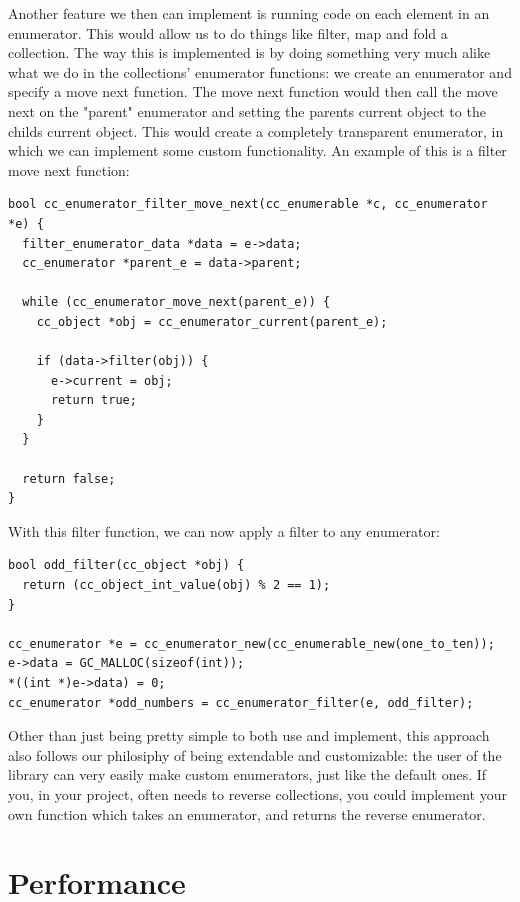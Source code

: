 \documentclass[table]{ituthesis}
\begin{document}
	Another feature we then can implement is running code on each element in an enumerator. This would allow us to do things like filter, map and fold a collection. The way this is implemented is by doing something very much alike what we do in the collections' enumerator functions: we create an enumerator and specify a move next function. The move next function would then call the move next on the "parent" enumerator and setting the parents current object to the childs current object. This would create a completely transparent enumerator, in which we can implement some custom functionality. An example of this is a filter move next function:
	
\begin{lstlisting}[label=cc_enumerator-filter-move_next,caption=Custom enumerator filter]
bool cc_enumerator_filter_move_next(cc_enumerable *c, cc_enumerator *e) {
  filter_enumerator_data *data = e->data;
  cc_enumerator *parent_e = data->parent;

  while (cc_enumerator_move_next(parent_e)) {
    cc_object *obj = cc_enumerator_current(parent_e);
  
    if (data->filter(obj)) {
      e->current = obj;
      return true;
    }
  }

  return false;
}
\end{lstlisting}	    

	With this filter function, we can now apply a filter to any enumerator:

\begin{lstlisting}[label=cc_enumerator-custom-filter,caption=Custom filter example]
bool odd_filter(cc_object *obj) {
  return (cc_object_int_value(obj) % 2 == 1);
}

cc_enumerator *e = cc_enumerator_new(cc_enumerable_new(one_to_ten));
e->data = GC_MALLOC(sizeof(int));
*((int *)e->data) = 0;
cc_enumerator *odd_numbers = cc_enumerator_filter(e, odd_filter);
\end{lstlisting}	

	Other than just being pretty simple to both use and implement, this approach also follows our philosiphy of being extendable and customizable: the user of the library can very easily make custom enumerators, just like the default ones. If you, in your project, often needs to reverse collections, you could implement your own function which takes an enumerator, and returns the reverse enumerator.
	

\section{Performance}
\end{document}
